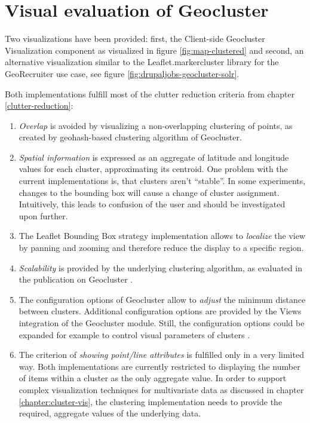 \section{Visual evaluation of Geocluster}

Two visualizations have been provided: first, the Client-side Geocluster Visualization component as visualized in figure \ref{fig:map-clustered} and second, an alternative visualization similar to the Leaflet.markercluster library for the GeoRecruiter use case, see figure \ref{fig:drupaljobs-geocluster-solr}.

Both implementations fulfill most of the clutter reduction criteria from chapter \ref{clutter-reduction}:

\begin{enumerate}

\item \textit{Overlap} is avoided by visualizing a non-overlapping clustering of points, as created by geohash-based clustering algorithm of Geocluster.

\item \textit{Spatial information} is expressed as an aggregate of latitude and longitude values for each cluster, approximating its centroid. One problem with the current implementations is, that clusters aren't ``stable''. In some experiments, changes to the bounding box will cause a change of cluster assignment. Intuitively, this leads to confusion of the user and should be investigated upon further. 

\item The Leaflet Bounding Box strategy implementation allows to \textit{localize} the view by panning and zooming and therefore reduce the display to a specific region.

\item \textit{Scalability} is provided by the underlying clustering algorithm, as evaluated in the publication on Geocluster \cite{geocluster-thesis}.

\item The configuration options of Geocluster allow to \textit{adjust} the minimum distance between clusters. Additional configuration options are provided by the Views integration of the Geocluster module. Still, the configuration options could be expanded for example to control visual parameters of clusters \cite{geocluster-thesis}.

\item The criterion of \textit{showing point/line attributes} is fulfilled only in a very limited way. Both implementations are currently restricted to displaying the number of items within a cluster as the only aggregate value. In order to support complex visualization techniques for multivariate data as discussed in chapter \ref{chapter:cluster-vis}, the clustering implementation needs to provide the required, aggregate values of the underlying data.


\end{enumerate}
